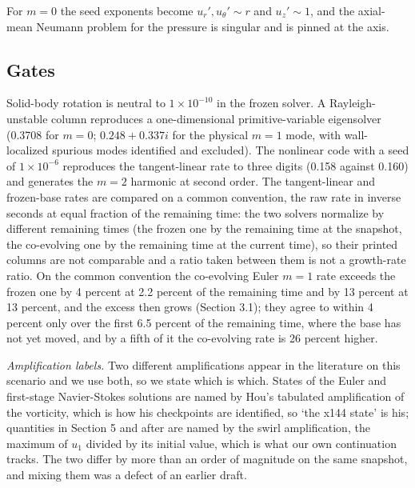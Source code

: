 \documentclass[11pt]{article}
\newcommand{\sn}[2]{#1\times 10^{#2}}
\begin{document}
For $m = 0$ the seed exponents become $u_r', u_\theta' \sim r$ and $u_z' \sim 1$, and the axial-mean Neumann problem for the pressure is singular and is pinned at the axis.

\subsection{Gates}

Solid-body rotation is neutral to $\sn{1}{-10}$ in the frozen solver. A Rayleigh-unstable column reproduces a one-dimensional primitive-variable eigensolver (0.3708 for $m = 0$; $0.248 + 0.337 i$ for the physical $m = 1$ mode, with wall-localized spurious modes identified and excluded). The nonlinear code with a seed of $\sn{1}{-6}$ reproduces the tangent-linear rate to three digits (0.158 against 0.160) and generates the $m = 2$ harmonic at second order. The tangent-linear and frozen-base rates are compared on a common convention, the raw rate in inverse seconds at equal fraction of the remaining time: the two solvers normalize by different remaining times (the frozen one by the remaining time at the snapshot, the co-evolving one by the remaining time at the current time), so their printed columns are not comparable and a ratio taken between them is not a growth-rate ratio. On the common convention the co-evolving Euler $m = 1$ rate exceeds the frozen one by 4 percent at 2.2 percent of the remaining time and by 13 percent at 13 percent, and the excess then grows (Section 3.1); they agree to within 4 percent only over the first 6.5 percent of the remaining time, where the base has not yet moved, and by a fifth of it the co-evolving rate is 26 percent higher.

\emph{Amplification labels.} Two different amplifications appear in the literature on this scenario and we use both, so we state which is which. States of the Euler and first-stage Navier-Stokes solutions are named by Hou's tabulated amplification of the vorticity, which is how his checkpoints are identified, so `the x144 state' is his; quantities in Section 5 and after are named by the swirl amplification, the maximum of $u_1$ divided by its initial value, which is what our own continuation tracks. The two differ by more than an order of magnitude on the same snapshot, and mixing them was a defect of an earlier draft.
\end{document}
